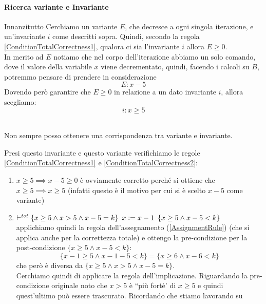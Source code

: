 \begin{esempio}
				      					\paragraph{Ricerca variante e Invariante}
				      					Innanzitutto Cerchiamo un variante $E$, che decresce a ogni singola iterazione, e
				      					un'invariante $i$ come descritti sopra. Quindi, secondo la regola  \ref{ConditionTotalCorrectness1}, qualora ci sia
				      					l'invariante $i$ allora  $E\geq 0$.\\
				      					In merito ad $E$ notiamo che nel corpo dell'iterazione abbiamo un solo	comando, dove il valore della variabile $x$ viene decrementato, quindi, facendo i calcoli su $B$, potremmo pensare di prendere in considerazione 
				      					\[E: x - 5\]
				      					Dovendo però garantire che $E\geq 0$ in relazione a un dato invariante $i$, allora scegliamo:
				      					\[i: x \geq 5\] \\		
				      					\begin{nota}
				      					Non sempre posso ottenere una corrispondenza tra variante e
				      						invariante.
				      					\end{nota}
				      					Presi questo invariante e questo variante verifichiamo le regole \ref{ConditionTotalCorrectness1} e \ref{ConditionTotalCorrectness2}:
				      					\begin{enumerate}
				      						\item $x\geq 5\implies x-5\geq 0$ è ovviamente corretto perché si ottiene
				      						      che $x\geq 5\implies x \geq 5$ (infatti questo è il motivo per cui si è
				      						      scelto $x-5$ come variante)
				      						\item $\vdash^{tot}\{x\geq 5\land x>5\land x-5=k\}\,\,\, x\cceq
				      						      x-1\,\,\,\{x\geq 5\land x-5<k\}$\\
				      						      applichiamo quindi la regola dell'assegnamento (\ref{AssignmentRule}) (che si applica anche per la
				      						      correttezza totale) e ottengo la pre-condizione per la post-condizione
				      						      $\{x\geq 5\land x-5<k\}$:
				      						      \[\{x-1\geq 5\land x-1-5<k\}=\{x\geq 6\land x-6 < k\}\]
				      						      che però è diversa da $\{x\geq 5\land x>5\land x-5=k\}$.\\
				      						      Cerchiamo quindi di applicare la regola dell'implicazione. Riguardando la
				      						      pre-condizione originale noto che $x>5$ è ``più fortè' di $x\geq 5$ e quindi
				      						      quest'ultimo può essere trascurato. Ricordando che stiamo lavorando su

\end{enumerate}
\end{esempio}
